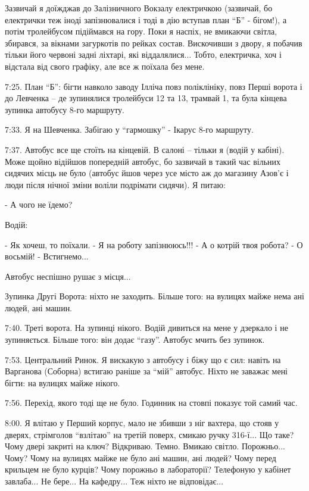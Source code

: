 Зазвичай я доїжджав до Залізничного Вокзалу електричкою (зазвичай, бо
електрички теж іноді запізнювалися і тоді в дію вступав план \enquote{Б} - бігом!), а
потім тролейбусом підіймався на гору. Поки я наспіх, не вмикаючи світла,
збирався, за вікнами загуркотів по рейках состав. Вискочивши з двору, я побачив
тільки його червоні задні ліхтарі, які віддалялися... Тобто, електричка, хоч і
відстала від свого графіку, але все ж поїхала без мене.

7:25. План \enquote{Б}: бігти навколо заводу Ілліча повз поліклініку, повз Перші ворота
і до Левченка – де зупинялися тролейбуси 12 та 13, трамвай 1, та була кінцева
зупинка автобусу 8-го маршруту. 

7:33. Я на Шевченка. Забігаю у \enquote{гармошку} - Ікарус 8-го маршруту. 

7:37. Автобус все ще стоїть на кінцевій. В салоні – тільки я (водій у
кабіні). Може щойно відійшов попередній автобус, бо зазвичай в такий час
вільних сидячих місць не було (автобус йшов через усе місто аж до магазину
Азов'є і люди після нічної зміни воліли подрімати сидячи). Я питаю:

- А чого не їдемо? 

Водій:

\obeycr
- Як хочеш, то поїхали.
- Я на роботу запізнююсь!!!
- А о котрій твоя робота? 
- О восьмій!
- Встигнемо...
\restorecr

Автобус неспішно рушає з місця...

Зупинка Другі Ворота: ніхто не заходить. Більше того: на вулицях майже нема ані людей, ані машин.

7:40. Треті ворота. На зупинці нікого. Водій дивиться на мене у дзеркало і
не зупиняється. Більше того: він додає \enquote{газу}. Автобус мчить без зупинок.

7:53. Центральний Ринок. Я вискакую з автобусу і біжу що є сил: навіть на
Варганова (Соборна) встигаю раніше за \enquote{мій} автобус. Ніхто не заважає мені
бігти: на вулицях майже нікого.

7:56. Перехід, якого тоді ще не було. Годинник на стовпі показує той самий час.

8:00. Я влітаю у Перший корпус, мало не збивши з ніг вахтера, що стояв у
дверях, стрімголов \enquote{взлітаю} на третій поверх, смикаю ручку 316-ї... Що
таке? Чому двері закриті на ключ? Відкриваю. Темно. Вмикаю світло.
Порожньо... Чому? Чому на вулицях майже не було ані машин, ані людей? Чому
перед крильцем не було курців? Чому порожньо в лабораторії? Телефоную у
кабінет завлаба... Не бере... На кафедру... Теж ніхто не відповідає...

